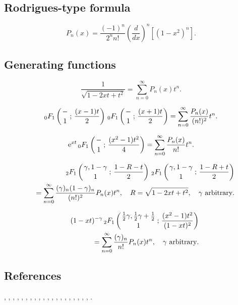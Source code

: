 \documentclass[envcountchap,graybox]{svmono}
\newcommand{\hyp}[5]{\mbox{}_{#1}{F}_{#2}
\left(\genfrac{}{}{0pt}{}{#3}{#4}\,;\,#5\right)}
\newcommand{\e}{\textrm{e}}
\newcommand{\hyp}[5]{\,\mbox{}_{#1}F_{#2}\!\left(
  \genfrac{}{}{0pt}{}{#3}{#4};#5\right)}
\begin{document}
\subsection*{Rodrigues-type formula}
\begin{equation}
\label{RodLegendre}
P_n(x)=\frac{(-1)^n}{2^nn!}\left(\frac{d}{dx}\right)^n\left[(1-x^2)^n\right].
\end{equation}

\subsection*{Generating functions}
\begin{equation}
\label{GenLegendre1}
\frac{1}{\sqrt{1-2xt+t^2}}=\sum_{n=0}^{\infty}P_n(x)t^n.
\end{equation}

\begin{equation}
\label{GenLegendre2}
\hyp{0}{1}{-}{1}{\frac{(x-1)t}{2}}\,\hyp{0}{1}{-}{1}{\frac{(x+1)t}{2}}=
\sum_{n=0}^{\infty}\frac{P_n(x)}{(n!)^2}t^n.
\end{equation}

\begin{equation}
\label{GenLegendre3}
\e^{xt}\,\hyp{0}{1}{-}{1}{\frac{(x^2-1)t^2}{4}}=
\sum_{n=0}^{\infty}\frac{P_n(x)}{n!}t^n.
\end{equation}

\begin{eqnarray}
\label{GenLegendre4}
& &\hyp{2}{1}{\gamma,1-\gamma}{1}{\frac{1-R-t}{2}}\,
\hyp{2}{1}{\gamma,1-\gamma}{1}{\frac{1-R+t}{2}}\nonumber\\
& &{}=\sum_{n=0}^{\infty}\frac{(\gamma)_n(1-\gamma)_n}{(n!)^2}P_n(x)t^n,
\quad R=\sqrt{1-2xt+t^2},\quad\textrm{$\gamma$ arbitrary}.
\end{eqnarray}

\begin{eqnarray}
\label{GenLegendre5}
& &(1-xt)^{-\gamma}\,\hyp{2}{1}{\frac{1}{2}\gamma,\frac{1}{2}\gamma+\frac{1}{2}}{1}
{\frac{(x^2-1)t^2}{(1-xt)^2}}\nonumber\\
& &{}=\sum_{n=0}^{\infty}\frac{(\gamma)_n}{n!}P_n(x)t^n,\quad\textrm{$\gamma$ arbitrary}.
\end{eqnarray}

\subsection*{References}
\cite{Abram}, \cite{Alladi}, \cite{AlSalam90}, \cite{Bhonsle}, \cite{Brafman51},
\cite{Carlitz57II}, \cite{Chihara78}, \cite{Danese}, \cite{Dattoli2001},
\cite{DilcherStolarsky}, \cite{ElbertLaforgia94}, \cite{Erdelyi+}, \cite{Grad},
\cite{Mathai}, \cite{Nikiforov+}, \cite{NikiforovUvarov}, \cite{Olver}, \cite{Rainville},
\cite{Szego75}, \cite{Temme}, \cite{Zayed}.
\end{document}

